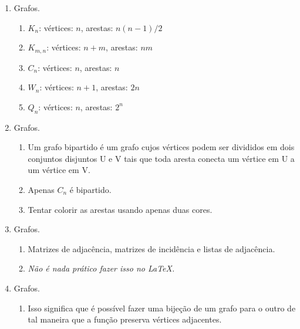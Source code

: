 \documentclass{article}
\begin{document}
\begin{enumerate}
	\item Grafos.

	      \begin{enumerate}

		      \item \( K_n \): vértices: \( n \), arestas: \( n(n-1)/2 \)

		      \item \( K_{m,n} \): vértices: \( n + m \), arestas: \( nm \)

		      \item \( C_n \): vértices: \( n \), arestas: \( n \)

		      \item \( W_n \): vértices: \( n + 1 \), arestas: \( 2n \)

		      \item \( Q_n \): vértices: \( n \), arestas: \( 2^n \)

	      \end{enumerate}

	\item Grafos.
	      \begin{enumerate}

		      \item Um grafo bipartido é um grafo cujos vértices podem ser divididos em dois conjuntos disjuntos U e V tais que toda aresta conecta um vértice em U a um vértice em V.

		      \item Apenas \( C_n \) é bipartido.

		      \item Tentar colorir as arestas usando apenas duas cores.

	      \end{enumerate}

	\item Grafos.
	      \begin{enumerate}

		      \item Matrizes de adjacência, matrizes de incidência e listas de adjacência.

		      \item \textit{Não é nada prático fazer isso no \LaTeX.}

	      \end{enumerate}

	\item Grafos.
	      \begin{enumerate}

		      \item Isso significa que é possível fazer uma bijeção de um grafo para o outro de tal maneira que a função preserva vértices adjacentes.


\end{enumerate}
\end{enumerate}
\end{document}
